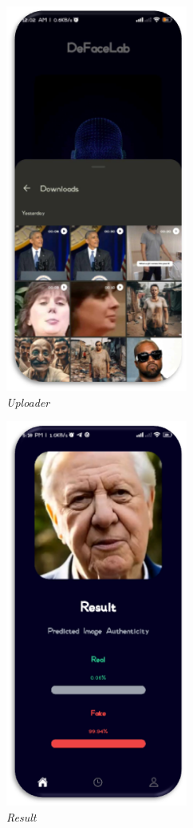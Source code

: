 \begin{figure}[ht]
    \centering
    \includegraphics[height =5in ]{img/uploaderv3.png}
    \caption{\textit{Uploader}}
\end{figure}

\begin{figure}[ht]
    \centering
    \includegraphics[height= 5in]{img/Results.png}
    \caption{\textit{Result}}
\end{figure}

